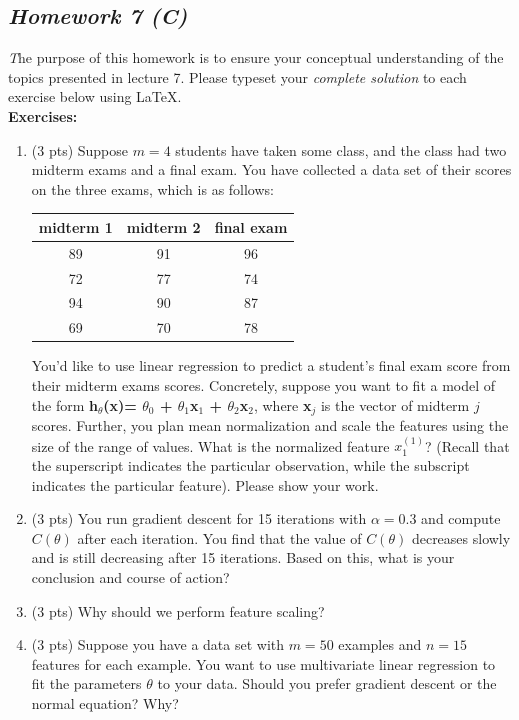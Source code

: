 \documentclass[11pt,a4paper,oneside]{report}
\begin{document}
\pagebreak

{\center\color{magenta}
\subsection*{\it\huge Homework 7 (C)}}

{\it\huge T}he purpose of this homework is to ensure your conceptual understanding of the topics presented in lecture 7. Please typeset your \emph{complete solution} to each exercise below using \LaTeX.\\

{\bf Exercises:}\\
\begin{enumerate}
\item (3 pts) Suppose $m=4$ students have taken some class, and the class had two midterm exams and a final exam. You have collected a data set of their scores on the three exams, which is as follows:
\begin{center}
\begin{tabular}{| c | c | c |}
\hline
midterm 1 & midterm 2 & final exam\\
\hline
89 & 91 & 96 \\
\hline
72 & 77 & 74 \\
\hline
94 & 90 & 87 \\
\hline
69 & 70 & 78 \\
\hline
\end{tabular}
\end{center}
You'd like to use linear regression to predict a student's final exam score from their midterm exams scores. Concretely, suppose you want to fit a model of the form {\bf h$_{\theta}$(x)= $\theta_0$ + $\theta_1$x$_1$ + $\theta_2$x$_2$}, where {\bf x}$_j$ is the vector of midterm $j$ scores. Further, you plan mean normalization and scale the features using the size of the range of values. What is the normalized feature $x^{(1)}_1$? (Recall that the superscript indicates the particular observation, while the subscript indicates the particular feature). Please show your work.
\item (3 pts) You run gradient descent for 15 iterations with $\alpha=0.3$ and compute $C(\theta)$ after each iteration. You find that the value of $C(\theta)$ decreases slowly and is still decreasing after 15 iterations. Based on this, what is your conclusion and course of action?
\item (3 pts) Why should we perform feature scaling?
\item (3 pts) Suppose you have a data set with $m=50$ examples and $n=15$ features for each example. You want to use multivariate linear regression to fit the parameters $\theta$ to your data. Should you prefer gradient descent or the normal equation? Why?


\end{enumerate}
\end{document}

